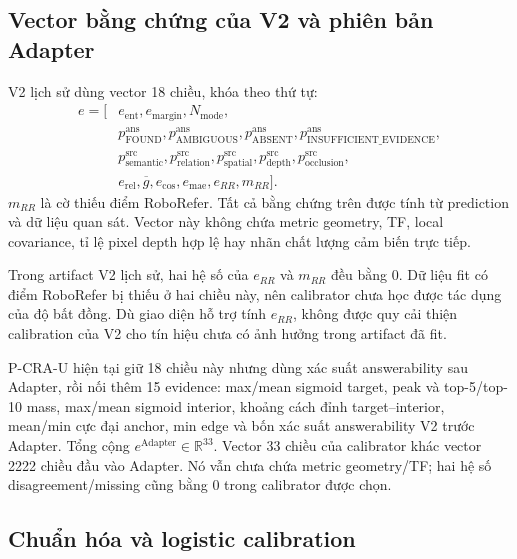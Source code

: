 \subsection{Vector bằng chứng của V2 và phiên bản Adapter}

V2 lịch sử dùng vector 18 chiều, khóa theo thứ tự:
\begin{equation}
\begin{split}
    e=[&
    e_{\mathrm{ent}},e_{\mathrm{margin}},N_{\mathrm{mode}},\\
    &p_{\mathrm{FOUND}}^{\mathrm{ans}},
    p_{\mathrm{AMBIGUOUS}}^{\mathrm{ans}},
    p_{\mathrm{ABSENT}}^{\mathrm{ans}},
    p_{\mathrm{INSUFFICIENT\_EVIDENCE}}^{\mathrm{ans}},\\
    &p_{\mathrm{semantic}}^{\mathrm{src}},
    p_{\mathrm{relation}}^{\mathrm{src}},
    p_{\mathrm{spatial}}^{\mathrm{src}},
    p_{\mathrm{depth}}^{\mathrm{src}},
    p_{\mathrm{occlusion}}^{\mathrm{src}},\\
    &e_{\mathrm{rel}},\overline{g},
    e_{\mathrm{cos}},e_{\mathrm{mae}},e_{RR},m_{RR}].
\end{split}
\end{equation}
$m_{RR}$ là cờ thiếu điểm RoboRefer. Tất cả bằng chứng trên được
tính từ prediction và dữ liệu quan sát. Vector này không
chứa metric geometry, TF, local covariance, tỉ lệ pixel depth
hợp lệ hay nhãn chất lượng cảm biến trực tiếp.

Trong artifact V2 lịch sử, hai hệ số của $e_{RR}$ và
$m_{RR}$ đều bằng 0. Dữ liệu fit có điểm RoboRefer bị thiếu ở
hai chiều này, nên calibrator chưa học được tác dụng của độ
bất đồng. Dù giao diện hỗ trợ tính $e_{RR}$, không được quy
cải thiện calibration của V2 cho tín hiệu chưa có ảnh hưởng
trong artifact đã fit.

P-CRA-U hiện tại giữ 18 chiều này nhưng dùng xác suất answerability
sau Adapter, rồi nối thêm 15 evidence: max/mean sigmoid target,
peak và top-5/top-10 mass, max/mean sigmoid interior,
khoảng cách đỉnh target--interior, mean/min cực đại anchor,
min edge và bốn xác suất answerability V2 trước Adapter.
Tổng cộng $e^{\mathrm{Adapter}}\in\mathbb{R}^{33}$.
Vector 33 chiều của calibrator khác vector 2222 chiều đầu vào Adapter.
Nó vẫn chưa chứa metric geometry/TF; hai hệ số disagreement/missing
cũng bằng 0 trong calibrator được chọn.

\subsection{Chuẩn hóa và logistic calibration}

